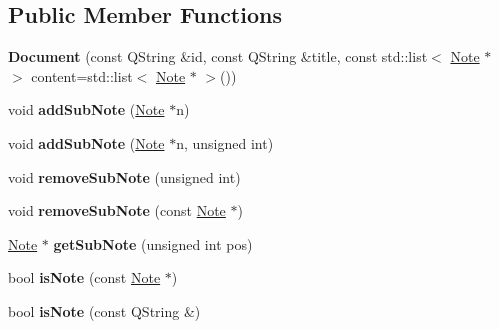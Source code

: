 \subsection*{\-Public \-Member \-Functions}
\begin{DoxyCompactItemize}
\item 
\hypertarget{classDocument_a981b6426029d44d63384548cb347ea9f}{{\bfseries \-Document} (const \-Q\-String \&id, const \-Q\-String \&title, const std\-::list$<$ \hyperlink{classNote}{\-Note} $\ast$ $>$ content=std\-::list$<$ \hyperlink{classNote}{\-Note} $\ast$ $>$())}\label{classDocument_a981b6426029d44d63384548cb347ea9f}

\item 
\hypertarget{classDocument_a497e0d38a648361bbc5f9e8eb6da04a7}{void {\bfseries add\-Sub\-Note} (\hyperlink{classNote}{\-Note} $\ast$n)}\label{classDocument_a497e0d38a648361bbc5f9e8eb6da04a7}

\item 
\hypertarget{classDocument_a9bd7efe91c8d6e7d7076b1abf0b066fb}{void {\bfseries add\-Sub\-Note} (\hyperlink{classNote}{\-Note} $\ast$n, unsigned int)}\label{classDocument_a9bd7efe91c8d6e7d7076b1abf0b066fb}

\item 
\hypertarget{classDocument_a66a3b9b6cb032fdafc7eb279d2c87966}{void {\bfseries remove\-Sub\-Note} (unsigned int)}\label{classDocument_a66a3b9b6cb032fdafc7eb279d2c87966}

\item 
\hypertarget{classDocument_a4c718cf328450937d10e8c355d3b6422}{void {\bfseries remove\-Sub\-Note} (const \hyperlink{classNote}{\-Note} $\ast$)}\label{classDocument_a4c718cf328450937d10e8c355d3b6422}

\item 
\hypertarget{classDocument_a0d28a68344f71d71c44b6f5ef27b97cb}{\hyperlink{classNote}{\-Note} $\ast$ {\bfseries get\-Sub\-Note} (unsigned int pos)}\label{classDocument_a0d28a68344f71d71c44b6f5ef27b97cb}

\item 
\hypertarget{classDocument_aeea96bc9cb8575b90cb6508622746e5a}{bool {\bfseries is\-Note} (const \hyperlink{classNote}{\-Note} $\ast$)}\label{classDocument_aeea96bc9cb8575b90cb6508622746e5a}

\item 
\hypertarget{classDocument_abd1b2179b00d843932abf4aef2b1d07e}{bool {\bfseries is\-Note} (const \-Q\-String \&)}\label{classDocument_abd1b2179b00d843932abf4aef2b1d07e}


\end{DoxyCompactItemize}
